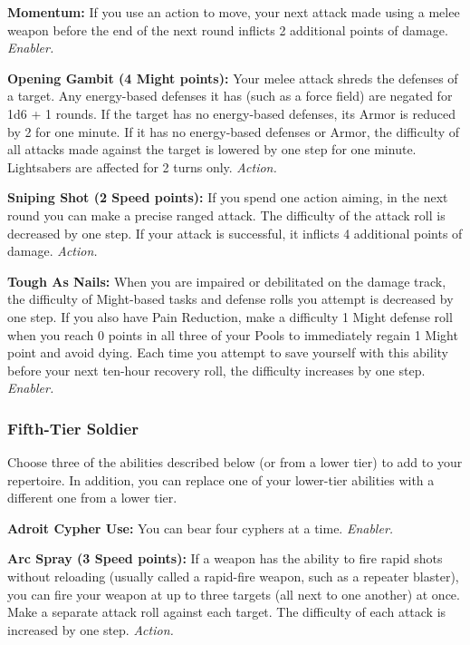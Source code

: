 \documentclass[a4paper,10pt,final,twocolumn,oneside]{book}
\newcommand{\itemAbility}[2]{\textcolor{25gray}{\textbullet\textbf{ #1:}}{ #2}\par}
\newcommand{\enabler}{\textit{ Enabler.}}
\newcommand{\action}{\textit{ Action.}}
\begin{document}
\itemAbility{Momentum}{If you use an action to move, your next attack made using a melee weapon before the end of the next round inflicts 2 additional points of damage.\enabler}

\itemAbility{Opening Gambit (4 Might points)}{Your melee attack shreds the defenses of a target. Any energy-based defenses it has (such as a force field) are negated for 1d6 + 1 rounds. If the target has no energy-based defenses, its Armor is reduced by 2 for one minute. If it has no energy-based defenses or Armor, the difficulty of all attacks made against the target is lowered by one step for one minute. Lightsabers are affected for 2 turns only.\action}

\itemAbility{Sniping Shot (2 Speed points)}{If you spend one action aiming, in the next round you can make a precise ranged attack. The difficulty of the attack roll is decreased by one step. If your attack is successful, it inflicts 4 additional points of damage.\action}

\itemAbility{Tough As Nails}{When you are impaired or debilitated on the damage track, the difficulty of Might-based tasks and defense rolls you attempt is decreased by one step. If you also have Pain Reduction, make a difficulty 1 Might defense roll when you reach 0 points in all three of your Pools to immediately regain 1 Might point and avoid dying. Each time you attempt to save yourself with this ability before your next ten-hour recovery roll, the difficulty increases by one step.\enabler}


\subsubsection*{Fifth-Tier Soldier}
\label{subsub:soldierFifthTier}

Choose three of the abilities described below (or from a lower tier) to add to your repertoire. In addition, you can replace one of your lower-tier abilities with a different one from a lower tier.

\itemAbility{Adroit Cypher Use}{You can bear four cyphers at a time.\enabler}

\itemAbility{Arc Spray (3 Speed points)}{If a weapon has the ability to fire rapid shots without reloading (usually called a rapid-fire weapon, such as a repeater blaster), you can fire your weapon at up to three targets (all next to one another) at once. Make a separate attack roll against each target. The difficulty of each attack is increased by one step.\action}
\end{document}
